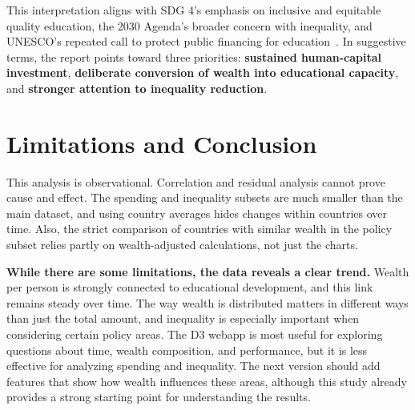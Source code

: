 \documentclass{vgtc}
\begin{document}
This interpretation aligns with SDG 4's emphasis on inclusive and equitable quality education, the 2030 Agenda's broader concern with inequality, and UNESCO's repeated call to protect public financing for education~\cite{sdg2030,unesco2030,paris2022,efw2024}. In suggestive terms, the report points toward three priorities: \textbf{sustained human-capital investment}, \textbf{deliberate conversion of wealth into educational capacity}, and \textbf{stronger attention to inequality reduction}.

\section{Limitations and Conclusion}
This analysis is observational. Correlation and residual analysis cannot prove cause and effect. The spending and inequality subsets are much smaller than the main dataset, and using country averages hides changes within countries over time. Also, the strict comparison of countries with similar wealth in the policy subset relies partly on wealth-adjusted calculations, not just the charts.

\textbf{While there are some limitations, the data reveals a clear trend.} Wealth per person is strongly connected to educational development, and this link remains steady over time. The way wealth is distributed matters in different ways than just the total amount, and inequality is especially important when considering certain policy areas. The D3 webapp is most useful for exploring questions about time, wealth composition, and performance, but it is less effective for analyzing spending and inequality. The next version should add features that show how wealth influences these areas, although this study already provides a strong starting point for understanding the results. 
\end{document}
